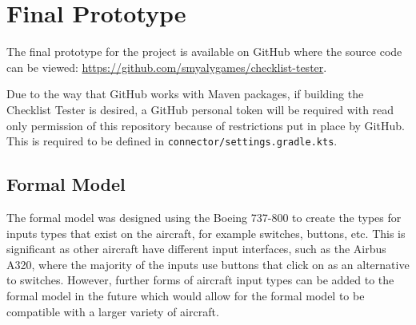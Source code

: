 \documentclass[../dissertation.tex]{subfiles}
\begin{document}
\section{Final Prototype}
The final prototype for the project is available on GitHub where the source code can be viewed:
\url{https://github.com/smyalygames/checklist-tester}.

Due to the way that GitHub works with Maven packages, if building the Checklist Tester
is desired, a GitHub personal token will be required with read only permission of
this repository because of restrictions put in place by GitHub. This is required
to be defined in \lstinline|connector/settings.gradle.kts|.

\subsection{Formal Model}

The formal model was designed using the Boeing 737-800 to create the
types for inputs types that exist on the aircraft, for example
switches, buttons, etc. This is significant as other aircraft
have different input interfaces, such as the Airbus A320, where the
majority of the inputs use buttons that click on as an alternative to switches.
However, further forms of aircraft input types can be added to the formal model
in the future which would allow for the formal model to be compatible with
a larger variety of aircraft.
\end{document}
